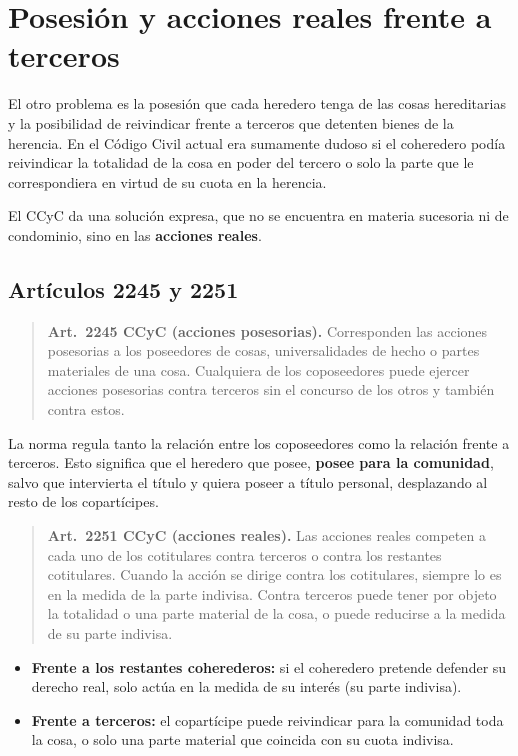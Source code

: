 \documentclass[12pt,oneside]{book}
\begin{document}
\section{Posesión y acciones reales frente a terceros}

El otro problema es la posesión que cada heredero tenga de las cosas hereditarias y la posibilidad de reivindicar frente a terceros que detenten bienes de la herencia. En el Código Civil actual era sumamente dudoso si el coheredero podía reivindicar la totalidad de la cosa en poder del tercero o solo la parte que le correspondiera en virtud de su cuota en la herencia.

El CCyC da una solución expresa, que no se encuentra en materia sucesoria ni de condominio, sino en las \textbf{acciones reales}.

\subsection{Artículos 2245 y 2251}

\begin{quote}
\textbf{Art.~2245 CCyC (acciones posesorias).} Corresponden las acciones posesorias a los poseedores de cosas, universalidades de hecho o partes materiales de una cosa. Cualquiera de los coposeedores puede ejercer acciones posesorias contra terceros sin el concurso de los otros y también contra estos.
\end{quote}

La norma regula tanto la relación entre los coposeedores como la relación frente a terceros. Esto significa que el heredero que posee, \textbf{posee para la comunidad}, salvo que intervierta el título y quiera poseer a título personal, desplazando al resto de los copartícipes.

\begin{quote}
\textbf{Art.~2251 CCyC (acciones reales).} Las acciones reales competen a cada uno de los cotitulares contra terceros o contra los restantes cotitulares. Cuando la acción se dirige contra los cotitulares, siempre lo es en la medida de la parte indivisa. Contra terceros puede tener por objeto la totalidad o una parte material de la cosa, o puede reducirse a la medida de su parte indivisa.
\end{quote}

\begin{itemize}
    \item \textbf{Frente a los restantes coherederos:} si el coheredero pretende defender su derecho real, solo actúa en la medida de su interés (su parte indivisa).
    \item \textbf{Frente a terceros:} el copartícipe puede reivindicar para la comunidad toda la cosa, o solo una parte material que coincida con su cuota indivisa.
\end{itemize}
\end{document}
